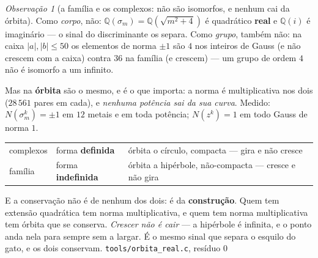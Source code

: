 \documentclass[11pt]{article}
\newcommand{\code}[1]{\texttt{\small #1}}
\newcommand{\Q}{\mathbb Q}
\theoremstyle{plain}
\theoremstyle{remark}
\newtheorem{obs}{Observação}
\begin{document}
\begin{obs}[a família e os complexos: não são isomorfos, e nenhum cai da órbita]\label{obs:orbitareal}
Como \emph{corpo}, não: $\Q(\sigma_m)=\Q(\sqrt{m^2+4})$ é quadrático \textbf{real} e $\Q(i)$ é
imaginário --- o sinal do discriminante os separa. Como \emph{grupo}, também não: na caixa
$|a|,|b|\le50$ os elementos de norma $\pm1$ são $4$ nos inteiros de Gauss (e não crescem com a
caixa) contra $36$ na família (e crescem) --- um grupo de ordem $4$ não é isomorfo a um infinito.

Mas na \textbf{órbita} são o mesmo, e é o que importa: a norma é multiplicativa nos dois
($28\,561$ pares em cada), e \emph{nenhuma potência sai da sua curva}. Medido: $N(\sigma_m^k)=\pm1$
em $12$ metais e em toda potência; $N(z^k)=1$ em todo Gauss de norma $1$.
\begin{center}
\begin{tabular}{lll}
\toprule
complexos & forma \textbf{definida} & órbita o círculo, compacta --- gira e não cresce\\
família & forma \textbf{indefinida} & órbita a hipérbole, não-compacta --- cresce e não gira\\
\bottomrule
\end{tabular}
\end{center}
E a conservação não é de nenhum dos dois: é da \textbf{construção}. Quem tem extensão quadrática
tem norma multiplicativa, e quem tem norma multiplicativa tem órbita que se conserva. \emph{Crescer
não é cair} --- a hipérbole é infinita, e o ponto anda nela para sempre sem a largar. É o mesmo
sinal que separa o esquilo do gato, e os dois conservam.
\hfill{\small\code{tools/orbita\_real.c}, resíduo $0$}
\end{obs}
\end{document}
